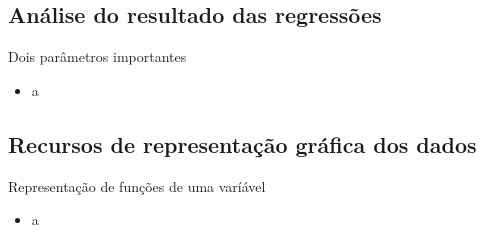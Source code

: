 \documentclass[a4paper,10pt]{beamer}
\begin{document}
\subsection{Análise do resultado das regressões}

\begin{frame}{Dois parâmetros importantes}
    \begin{itemize}
	\item a
    \end{itemize}

\end{frame}

\subsection{Recursos de representação gráfica dos dados}

\begin{frame}{Representação de funções de uma varíável}
    \begin{itemize}
	\item a
    \end{itemize}

\end{frame}
\end{document}
